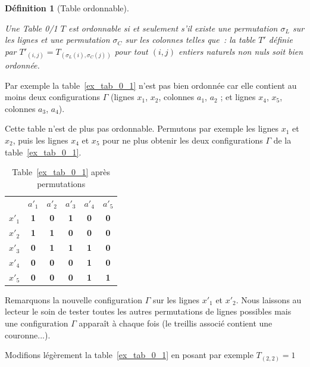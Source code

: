 \documentclass[a4paper]{report}
\renewcommand{\textbf}[1]{\begingroup\bfseries\mathversion{bold}#1\endgroup}
\newtheorem{definition}{Définition}[chapter]
\begin{document}
\begin{definition}[Table ordonnable]

\label{tableordonnable}

Une Table 0/1 $T$ est \textit{ordonnable} si et seulement s'il existe une permutation $\sigma_L$ sur les lignes 
et une permutation $\sigma_C$ sur les colonnes telles que~:
la table $T'$ définie par $T'_{(i, j)} = T_{(\sigma_L(i), \sigma_C(j))}$ pour tout $(i, j)$ entiers naturels 
non nuls soit bien ordonnée.
\end{definition}

Par exemple la table~\ref{ex_tab_0_1} n'est pas bien ordonnée car elle contient au moins deux configurations $\Gamma$ (lignes $x_1$, $x_2$, colonnes $a_1$, $a_2$ ;
 et lignes $x_4$, $x_5$, colonnes $a_3$, $a_4$).

Cette table n'est de plus pas ordonnable. Permutons par exemple les lignes $x_1$ et $x_2$,
 puis les lignes $x_4$ et $x_5$ pour ne plus obtenir les deux configurations $\Gamma$ de la table~\ref{ex_tab_0_1}. 

\begin{table}[htb]
  \centering

\begin{tabular}{lccccc}
 & $a'_1$ & $a'_2$ & $a'_3$ & $a'_4$ & $a'_5$\\
$x'_1$ & \textbf{1} & \textbf{0} & \textbf{1} & \textbf{0} & \textbf{0}\\
$x'_2$ & \textbf{1} & \textbf{1} & \textbf{0} & \textbf{0} & \textbf{0}\\
$x'_3$ & \textbf{0} & \textbf{1} & \textbf{1} & \textbf{1} & \textbf{0}\\
$x'_4$ & \textbf{0} & \textbf{0} & \textbf{0} & \textbf{1} & \textbf{0}\\
$x'_5$ & \textbf{0} & \textbf{0} & \textbf{0} & \textbf{1} & \textbf{1}

\end{tabular}

\caption{Table~\ref{ex_tab_0_1} après permutations}

\label{3ex_tab_0_1}

\end{table}

Remarquons la nouvelle configuration $\Gamma$ sur les lignes $x'_1$ et $x'_2$. 
Nous laissons au lecteur le soin de tester toutes les autres permutations de lignes 
possibles mais une configuration $\Gamma$ apparaît à chaque fois (le treillis associé contient une couronne...).

Modifions légèrement la table~\ref{ex_tab_0_1} en posant par exemple $T_{(2,2)} = 1$ 
\end{document}
